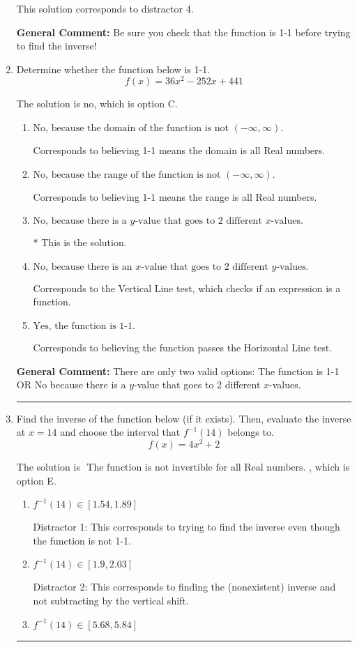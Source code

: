 \documentclass{extbook}[14pt]
\newcommand{\litem}[1]{\item #1

\rule{\textwidth}{0.4pt}}
\begin{document}
\begin{enumerate}
{\begin{enumerate}[label=\Alph*.]
 This solution corresponds to distractor 4.
\end{enumerate}

\textbf{General Comment:} Be sure you check that the function is 1-1 before trying to find the inverse!
}
\litem{
Determine whether the function below is 1-1.
\[ f(x) = 36 x^2 - 252 x + 441 \]

The solution is \( \text{no} \), which is option C.\begin{enumerate}[label=\Alph*.]
\item \( \text{No, because the domain of the function is not $(-\infty, \infty)$.} \)

Corresponds to believing 1-1 means the domain is all Real numbers.
\item \( \text{No, because the range of the function is not $(-\infty, \infty)$.} \)

Corresponds to believing 1-1 means the range is all Real numbers.
\item \( \text{No, because there is a $y$-value that goes to 2 different $x$-values.} \)

* This is the solution.
\item \( \text{No, because there is an $x$-value that goes to 2 different $y$-values.} \)

Corresponds to the Vertical Line test, which checks if an expression is a function.
\item \( \text{Yes, the function is 1-1.} \)

Corresponds to believing the function passes the Horizontal Line test.
\end{enumerate}

\textbf{General Comment:} There are only two valid options: The function is 1-1 OR No because there is a $y$-value that goes to 2 different $x$-values.
}
\litem{
Find the inverse of the function below (if it exists). Then, evaluate the inverse at $x = 14$ and choose the interval that $f^{-1}(14)$ belongs to.
\[ f(x) = 4 x^2 + 2 \]

The solution is \( \text{ The function is not invertible for all Real numbers. } \), which is option E.\begin{enumerate}[label=\Alph*.]
\item \( f^{-1}(14) \in [1.54, 1.89] \)

 Distractor 1: This corresponds to trying to find the inverse even though the function is not 1-1. 
\item \( f^{-1}(14) \in [1.9, 2.03] \)

 Distractor 2: This corresponds to finding the (nonexistent) inverse and not subtracting by the vertical shift.
\item \( f^{-1}(14) \in [5.68, 5.84] \)


\end{enumerate}}
\end{enumerate}
\end{document}
